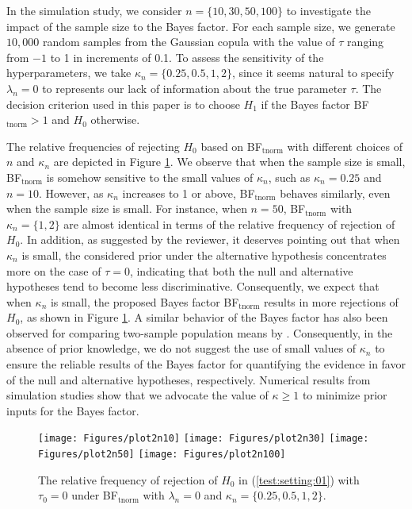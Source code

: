 \documentclass[11pt]{article}
\begin{document}
In the simulation study, we consider $n =\{10, 30, 50, 100\}$ to investigate the impact of the sample size to the Bayes factor. For each sample size, we generate $10,000$ random samples from the Gaussian copula with the value of $\tau$ ranging from $-1$ to 1 in increments of 0.1. To assess the sensitivity of the hyperparameters, we take $\kappa_n = \{0.25, 0.5, 1, 2\}$, since it seems natural to specify $\lambda_n = 0$ to represents our lack of information about the true parameter $\tau$. The decision criterion used in this paper is to choose $H_1$ if the Bayes factor BF$_\mathrm{tnorm} > 1$ and $H_0$ otherwise.

The relative frequencies of rejecting $H_0$ based on BF$_\mathrm{tnorm}$ with different choices of $n$ and $\kappa_n$ are depicted in Figure \ref{FIG:FR2}.
We observe that when the sample size is small, BF$_\mathrm{tnorm}$ is somehow sensitive to the small values of $\kappa_n$, such as $\kappa_n =0.25$ and $n = 10$. However, as $\kappa_n$ increases to 1 or above, BF$_\mathrm{tnorm}$ behaves similarly, even when the sample size is small. For instance, when $n = 50$, BF$_\mathrm{tnorm}$ with $\kappa_n = \{1, 2\}$ are almost identical in terms of the relative frequency of rejection of $H_0$. In addition, as suggested by the reviewer, it deserves pointing out that when $\kappa_n$ is small, the considered prior under the alternative hypothesis concentrates more on the case of $\tau = 0$, indicating that both the null and alternative hypotheses tend to become less discriminative. Consequently, we expect that when $\kappa_n$ is small, the proposed Bayes factor BF$_\mathrm{tnorm}$ results in more rejections of $H_0$, as shown in Figure \ref{FIG:FR2}. A similar behavior of the Bayes factor  has also been observed for comparing two-sample population means by \cite{Wang:Liu:2016}. Consequently, in the absence of prior knowledge, we do not suggest the use of small values of $\kappa_n$ to ensure the reliable results of the Bayes factor for quantifying the evidence in favor of the null and alternative hypotheses, respectively. Numerical results from simulation studies show that we advocate the value of $\kappa \geq 1$ to minimize prior inputs for the Bayes factor.

{
\begin{figure}[!h]
\centering
\texttt{[image: Figures/plot2n10]}
\texttt{[image: Figures/plot2n30]}
\texttt{[image: Figures/plot2n50]}
\texttt{[image: Figures/plot2n100]}
\caption{The relative frequency of rejection of $H_0$ in (\ref{test:setting:01}) with $\tau_0 = 0$ under BF$_\mathrm{tnorm}$ with $\lambda_n = 0$ and $\kappa_n = \{ 0.25, 0.5, 1, 2\}$.} \label{FIG:FR2}
\end{figure}
}
\end{document}
